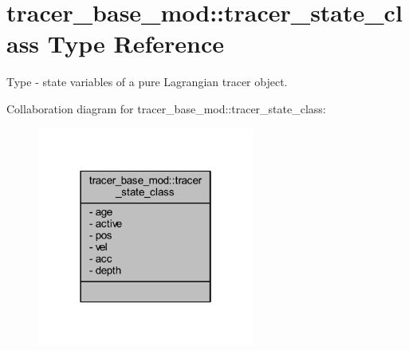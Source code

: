 \hypertarget{structtracer__base__mod_1_1tracer__state__class}{}\section{tracer\+\_\+base\+\_\+mod\+:\+:tracer\+\_\+state\+\_\+class Type Reference}
\label{structtracer__base__mod_1_1tracer__state__class}


Type -\/ state variables of a pure Lagrangian tracer object.  




Collaboration diagram for tracer\+\_\+base\+\_\+mod\+:\+:tracer\+\_\+state\+\_\+class\+:
\nopagebreak
\begin{figure}[H]
\begin{center}
\leavevmode
\includegraphics[width=202pt]{structtracer__base__mod_1_1tracer__state__class__coll__graph}
\end{center}
\end{figure}
